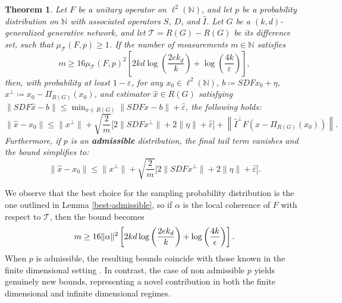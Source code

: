 \documentclass[a4paper,oneside]{amsart}
\newtheorem{theorem}{Theorem}[section]
\begin{document}
\begin{theorem}\label{thm:main-recovery-merged}
    Let $F$ be a unitary operator on $\ell^2(\mathbb{N})$, and let $p$ be a probability distribution on $\mathbb{N}$ with associated operators $S$, $D$, and $\hat{I}$. Let $G$ be a $(k, d)$-generalized generative network, and let $\mathcal{T} = R(G) - R(G)$ be its difference set, such that $\mu_{\mathcal{T}}(F,p) \geq 1$. If the number of measurements $m \in \mathbb{N}$ satisfies
    \begin{equation*}
        m \geq 16\mu_{\mathcal{T}}(F,p)^2  \left[ 2kd \log\left(\frac{2e k_d}{k}\right) + \log\left(\frac{4k}{\varepsilon}\right) \right],
    \end{equation*}
    then, with probability at least $1-\varepsilon$, for any $x_0 \in \ell^2(\mathbb{N})$, $b \coloneqq SDFx_0 + \eta$, $x^\perp \coloneqq  x_0 - \Pi_{R(G)}(x_0)$, and estimator $\hat{x} \in R(G)$ satisfying  $\lVert SDF\hat{x} - b \rVert \leq \min_{x\in R(G)} \lVert SDFx - b \rVert + \hat{\varepsilon}$, the following holds:
    \begin{equation}\label{equazione-madre}
        \lVert \hat{x} - x_0 \rVert \leq \lVert x^\perp \rVert + \sqrt{\frac{2}{m}} \Big[2 \lVert SDF x^\perp \rVert + 2\lVert\eta \rVert +\hat{\varepsilon} \Big]+ \left\|\hat{I}^\perp F(\hat{x}-\Pi_{R(G)}(x_0))\right\|.
    \end{equation}
    Furthermore, if $p$ is an \textbf{admissible} distribution, the final tail term vanishes and the bound simplifies to:
    \begin{equation}\label{bound-admissible-simp}
        \lVert \hat{x} - x_0 \rVert \leq \lVert x^\perp \rVert +\sqrt{\frac{2}{m}} \Big[2 \lVert SDF x^\perp \rVert + 2\lVert\eta \rVert +\hat{\varepsilon} \Big].
    \end{equation}
\end{theorem}

We observe that the best choice for the sampling probability distribution is the one outlined in Lemma \ref{best-admissible}, so if $\alpha$ is the local coherence of $F$ with respect to $\mathcal{T}$, then the bound becomes
\begin{equation}\notag
    m \geq 16\| \alpha\|^2  \left[ 2kd \log\left(\frac{2e k_d}{k}\right) + \log\left(\frac{4k}{\epsilon}\right) \right].
\end{equation}
When $p$ is admissible, the resulting bounds coincide with those known in the finite dimensional setting \cite{Berk22,berk2023model}. In contrast, the case of non admissible $p$ yields genuinely new bounds, representing a novel contribution in both the finite dimensional and infinite dimensional regimes.
\end{document}
